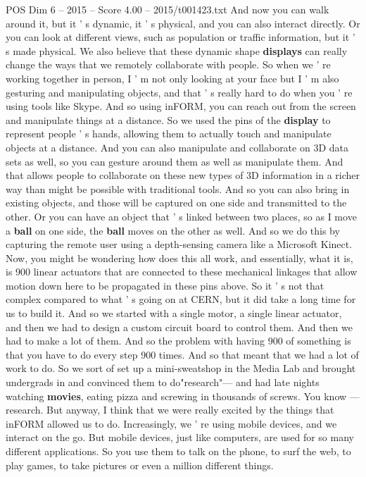 \begin{textsample}{POS Dim 6 – 2015 – Score 4.00 – 2015/t001423.txt}
And now you can walk around it, but it ' s dynamic, it ' s physical, and you can also interact directly.
Or you can look at different views, such as population or traffic information, but it ' s made physical.
We also believe that these dynamic shape \textbf{displays} can really change the ways that we remotely collaborate with people.
So when we ' re working together in person, I ' m not only looking at your face but I ' m also gesturing and manipulating objects, and that ' s really hard to do when you ' re using tools like Skype.
And so using inFORM, you can reach out from the screen and manipulate things at a distance.
So we used the pins of the \textbf{display} to represent people ' s hands, allowing them to actually touch and manipulate objects at a distance.
And you can also manipulate and collaborate on 3D data sets as well, so you can gesture around them as well as manipulate them.
And that allows people to collaborate on these new types of 3D information in a richer way than might be possible with traditional tools.
And so you can also bring in existing objects, and those will be captured on one side and transmitted to the other.
Or you can have an object that ' s linked between two places, so as I move a \textbf{ball} on one side, the \textbf{ball} moves on the other as well.
And so we do this by capturing the remote user using a depth-sensing camera like a Microsoft Kinect.
Now, you might be wondering how does this all work, and essentially, what it is, is 900 linear actuators that are connected to these mechanical linkages that allow motion down here to be propagated in these pins above.
So it ' s not that complex compared to what ' s going on at CERN, but it did take a long time for us to build it.
And so we started with a single motor, a single linear actuator, and then we had to design a custom circuit board to control them.
And then we had to make a lot of them.
And so the problem with having 900 of something is that you have to do every step 900 times.
And so that meant that we had a lot of work to do.
So we sort of set up a mini-sweatshop in the Media Lab and brought undergrads in and convinced them to do"research"— and had late nights watching \textbf{movies}, eating pizza and screwing in thousands of screws.
You know — research.
But anyway, I think that we were really excited by the things that inFORM allowed us to do.
Increasingly, we ' re using mobile devices, and we interact on the go.
But mobile devices, just like computers, are used for so many different applications.
So you use them to talk on the phone, to surf the web, to play games, to take pictures or even a million different things.

\end{textsample}
